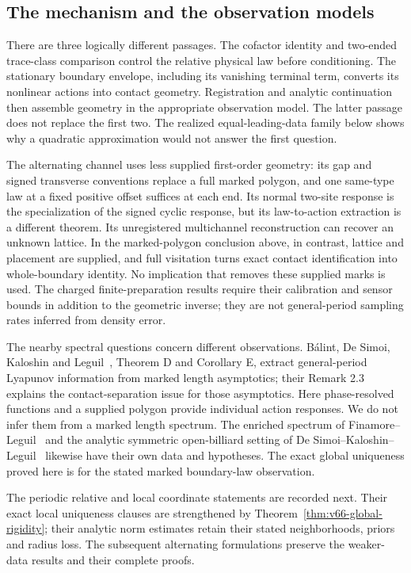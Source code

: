 \subsection{The mechanism and the observation models}

There are three logically different passages.  The cofactor identity and
two-ended trace-class comparison control the relative physical law before
conditioning.  The stationary boundary envelope, including its vanishing
terminal term, converts its nonlinear actions into contact geometry.
Registration and analytic continuation then assemble geometry in the
appropriate observation model.  The latter passage does not replace the
first two.  The realized equal-leading-data family below shows why a
quadratic approximation would not answer the first question.

The alternating channel uses less supplied first-order geometry: its gap
and signed transverse conventions replace a full marked polygon, and one
same-type law at a fixed positive offset suffices at each end.  Its
normal two-site response is the specialization of the signed cyclic
response, but its law-to-action extraction is a different theorem.  Its
unregistered multichannel reconstruction can recover an unknown lattice.
In the marked-polygon conclusion above, in contrast, lattice and placement
are supplied, and full visitation turns exact contact identification into
whole-boundary identity.  No implication that removes these supplied
marks is used.  The charged finite-preparation results require their
calibration and sensor bounds in addition to the geometric inverse;
they are not general-period sampling rates inferred from density error.

The nearby spectral questions concern different observations.
B\'alint, De Simoi, Kaloshin and Leguil~\cite{BDKL}, Theorem D and
Corollary E, extract general-period Lyapunov information from marked
length asymptotics; their Remark 2.3 explains the contact-separation
issue for those asymptotics.  Here phase-resolved functions and a supplied
polygon provide individual action responses.  We do not infer them from
a marked length spectrum.  The enriched spectrum of
Finamore--Leguil~\cite{FinamoreLeguil} and the analytic symmetric
open-billiard setting of De Simoi--Kaloshin--Leguil~\cite{DSKL} likewise
have their own data and hypotheses.  The exact global uniqueness proved
here is for the stated marked boundary-law observation.

The periodic relative and local coordinate statements are recorded next.
Their exact local uniqueness clauses are strengthened by
Theorem~\ref{thm:v66-global-rigidity}; their analytic norm estimates retain
their stated neighborhoods, priors and radius loss.  The subsequent
alternating formulations preserve the weaker-data results and their
complete proofs.
